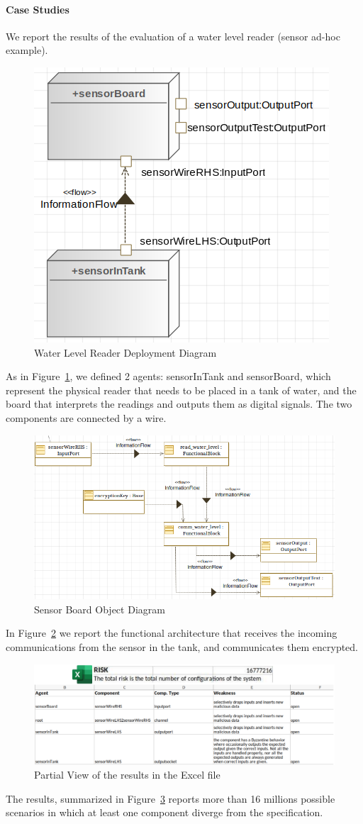 \documentclass[conference]{IEEEtran}
\begin{document}
\paragraph{Case Studies}
We report the results of the evaluation of a water level reader (sensor ad-hoc example). 
\begin{figure}
	\centering
	\includegraphics[width=.6\columnwidth]{eng_cs1.png}
	\caption{Water Level Reader Deployment Diagram}
	\label{fig:eng_cs1}
\end{figure}
As in Figure~\ref{fig:eng_cs1}, we defined 2 agents: sensorInTank and sensorBoard,
which represent the physical reader that needs to be placed in a tank of water, and 
the board that interprets the readings and outputs them as digital signals.
The two components are connected by a wire.
\begin{figure}
	\centering
	\includegraphics[width=.6\textwidth]{internal_cs1.png}
	\caption{Sensor Board Object Diagram}
	\label{fig:int_cs1}
\end{figure}
In Figure~\ref{fig:int_cs1} we report the functional architecture that
receives the incoming communications from the sensor in the tank, and 
communicates them encrypted.
\begin{figure}
	\centering
	\includegraphics[width=.7\textwidth]{results_excel.pdf}
	\caption{Partial View of the results in the Excel file}
	\label{fig:results}
\end{figure}
The results, summarized in Figure~\ref{fig:results} reports more than 16 millions
possible scenarios in which at least one component diverge from the specification.
\end{document}
